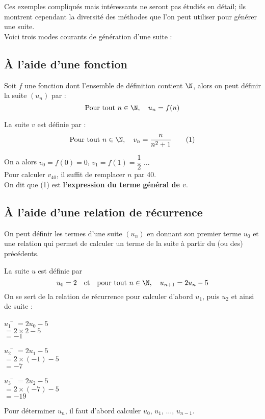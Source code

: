 \documentclass[a4paper,11pt,cours]{nsi} %
\begin{document}
Ces exemples compliqués mais intéressants ne seront pas étudiés en détail; ils montrent cependant la diversité des méthodes que l'on peut 
utiliser
pour générer une suite.\\
Voici trois modes courants de génération d'une suite :

\subsection{À l'aide d'une fonction }
Soit $f$ une fonction dont l'ensemble de définition contient $\N$, alors on peut définir la suite $(u_n)$ par : 
$$\text{Pour tout } n\in\N,\quad u_n=f(n)$$
\begin{exemple}[]
	La suite $v$ est définie par : $$\text{Pour tout } n\in\N,\quad v_n=\dfrac{n}{n^2+1}\qquad (1)$$ 
	
	On a alors $v_0=f(0)=0$,
	$v_1=f(1)=\dfrac{1}{2}$ $\ldots$\\[0.5em]
	Pour calculer $v_{40}$, il suffit de remplacer $n$ par 40.\\
	On dit que (1) est \textbf{l'expression du terme général de $v$}.
\end{exemple}


\subsection{À l'aide d'une relation de récurrence}
On peut définir les termes d'une suite $(u_n)$ en donnant son premier terme $u_0$ et une relation qui permet de calculer un terme de la suite à partir du (ou des) précédents.


\begin{exemple}[]
	La suite $u$ est définie par $$u_0=2\quad\text{et}\quad \text{pour tout } n\in\N,\quad u_{n+1}=2u_n-5$$
	On se sert de la relation de récurrence pour calculer d'abord $u_1$, puis $u_2$ et ainsi de suite :
	\begin{multicols}{3}
		\begin{tabbing}
			$u_1$	\=	$=2u_0-5$\\
			\>	$=2\times 2-5$\\
			\>	$=-1$
		\end{tabbing}
		
		\begin{tabbing}
			$u_2$	\=	$=2u_1-5$\\
			\>	$=2\times (-1)-5$\\
			\>	$=-7$
		\end{tabbing}
		\begin{tabbing}
			$u_3$	\=	$=2u_2-5$\\
			\>	$=2\times (-7)-5$\\
			\>	$=-19$
		\end{tabbing}
	\end{multicols}
	Pour déterminer $u_n$, il faut d'abord calculer $u_0$, $u_1$, $\ldots$, $u_{n-1}$.
\end{exemple}
\end{document}
